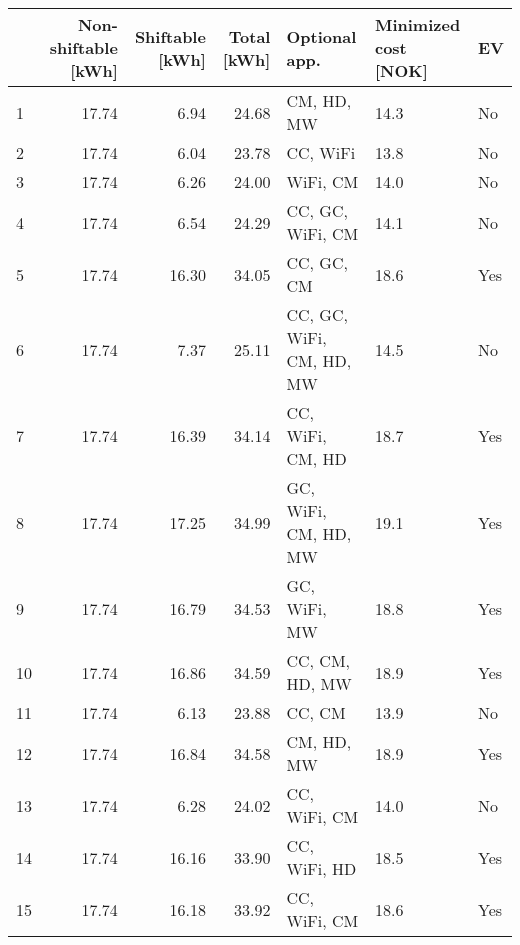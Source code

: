 \begin{tabular}{lrrrlll}
\toprule
{} &  Non-shiftable [kWh] &  Shiftable [kWh] &  Total [kWh] &             Optional app. & Minimized cost [NOK] &   EV \\
\midrule
1  &                17.74 &             6.94 &        24.68 &                CM, HD, MW &                 14.3 &   No \\
2  &                17.74 &             6.04 &        23.78 &                  CC, WiFi &                 13.8 &   No \\
3  &                17.74 &             6.26 &        24.00 &                  WiFi, CM &                 14.0 &   No \\
4  &                17.74 &             6.54 &        24.29 &          CC, GC, WiFi, CM &                 14.1 &   No \\
5  &                17.74 &            16.30 &        34.05 &                CC, GC, CM &                 18.6 &  Yes \\
6  &                17.74 &             7.37 &        25.11 &  CC, GC, WiFi, CM, HD, MW &                 14.5 &   No \\
7  &                17.74 &            16.39 &        34.14 &          CC, WiFi, CM, HD &                 18.7 &  Yes \\
8  &                17.74 &            17.25 &        34.99 &      GC, WiFi, CM, HD, MW &                 19.1 &  Yes \\
9  &                17.74 &            16.79 &        34.53 &              GC, WiFi, MW &                 18.8 &  Yes \\
10 &                17.74 &            16.86 &        34.59 &            CC, CM, HD, MW &                 18.9 &  Yes \\
11 &                17.74 &             6.13 &        23.88 &                    CC, CM &                 13.9 &   No \\
12 &                17.74 &            16.84 &        34.58 &                CM, HD, MW &                 18.9 &  Yes \\
13 &                17.74 &             6.28 &        24.02 &              CC, WiFi, CM &                 14.0 &   No \\
14 &                17.74 &            16.16 &        33.90 &              CC, WiFi, HD &                 18.5 &  Yes \\
15 &                17.74 &            16.18 &        33.92 &              CC, WiFi, CM &                 18.6 &  Yes \\

\end{tabular}
